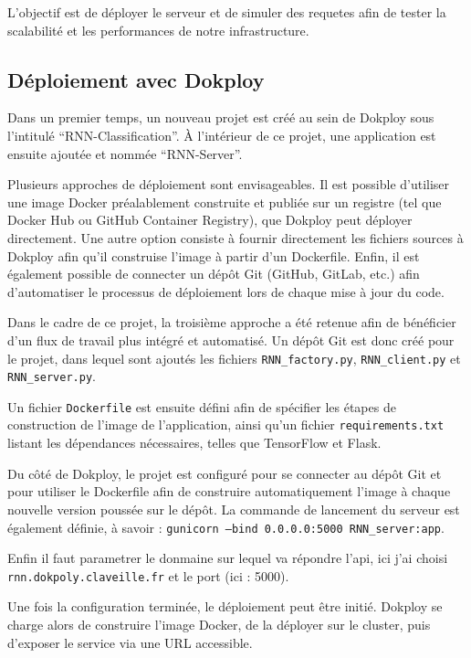 \documentclass{rapportClass} %
\begin{document}
L'objectif est de déployer le serveur et de simuler des requetes afin de tester la scalabilité et les performances de notre infrastructure.

\subsection{Déploiement avec Dokploy}

Dans un premier temps, un nouveau projet est créé au sein de Dokploy sous l'intitulé ``RNN-Classification''. 
À l'intérieur de ce projet, une application est ensuite ajoutée et nommée ``RNN-Server''.

Plusieurs approches de déploiement sont envisageables. Il est possible d’utiliser une image Docker préalablement construite 
et publiée sur un registre (tel que Docker Hub ou GitHub Container Registry), que Dokploy peut déployer directement. 
Une autre option consiste à fournir directement les fichiers sources à Dokploy afin qu’il construise l’image à partir d’un Dockerfile. 
Enfin, il est également possible de connecter un dépôt Git (GitHub, GitLab, etc.) afin d’automatiser le processus 
de déploiement lors de chaque mise à jour du code.

Dans le cadre de ce projet, la troisième approche a été retenue afin de bénéficier d’un flux de travail plus intégré et automatisé. 
Un dépôt Git est donc créé pour le projet, dans lequel sont ajoutés les fichiers \texttt{RNN\_factory.py}, \texttt{RNN\_client.py} et 
\texttt{RNN\_server.py}.

Un fichier \texttt{Dockerfile} est ensuite défini afin de spécifier les étapes de construction de l’image de l’application, 
ainsi qu’un fichier \texttt{requirements.txt} listant les dépendances nécessaires, telles que TensorFlow et Flask.

Du côté de Dokploy, le projet est configuré pour se connecter au dépôt Git et pour utiliser le Dockerfile afin de construire 
automatiquement l’image à chaque nouvelle version poussée sur le dépôt. La commande de lancement du serveur est également définie, 
à savoir : \texttt{gunicorn --bind 0.0.0.0:5000 RNN\_server:app}.

Enfin il faut parametrer le donmaine sur lequel va répondre l'api, ici j'ai choisi \texttt{rnn.dokpoly.claveille.fr} et le port (ici : 5000).

Une fois la configuration terminée, le déploiement peut être initié. Dokploy se charge alors de construire l’image Docker, 
de la déployer sur le cluster, puis d’exposer le service via une URL accessible.
\end{document}
